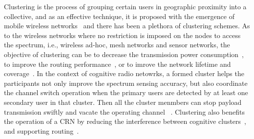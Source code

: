 \documentclass[times]{ettauth}
\newcommand{\ie}{i.e., }
\theoremstyle{mytheoremstyle}
\theoremstyle{mytheoremstyle}
\theoremstyle{mytheoremstyle}
\begin{document}
Clustering is the process of grouping certain users in geographic proximity into a collective, and as an effective technique, it is proposed with the emergence of mobile wireless networks~\cite{gerla_97} and there has been a plethora of clustering schemes.
As to the wireless networks where no restriction is imposed on the nodes to access the spectrum, \ie 
wireless ad-hoc, mesh networks and sensor networks, the objective of clustering can be to decrease the transmission power consumption~\cite{Kawadia03}, to improve the routing performance~\cite{clustering_mesh_globecom2010}, or to imrove the network lifetime and coverage~\cite{Abbasi_survey_07}.
In the context of cognitive radio netowrks, a formed cluster helps the participants not only improve the spectrum sensing accuracy, but also coordinate the channel switch operation when the primary users are detected by at least one secondary user in that cluster. Then all the cluster menmbers can stop payload transmission swiftly and vacate the operating channel ~\cite{willkomm08}.
Clustering also benefits the operation of a CRN by reducing the interference between cognitive clusters~\cite{centralizedSharing80222}, and supporting routing~\cite{Abbasi_survey_07}.
\end{document}
